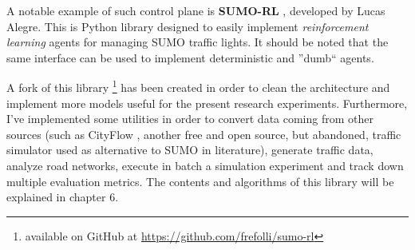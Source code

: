 A notable example of such control plane is \textbf{SUMO-RL} \cite{sumorl}, developed by Lucas Alegre. This is Python library designed to easily implement \textit{reinforcement learning} agents for managing SUMO traffic lights. It should be noted that the same interface can be used to implement deterministic and ''dumb`` agents.

A fork of this library \footnote{available on GitHub at \href{https://github.com/frefolli/sumo-rl}{https://github.com/frefolli/sumo-rl}} has been created in order to clean the architecture and implement more models useful for the present research experiments. Furthermore, I've implemented some utilities in order to convert data coming from other sources (such as CityFlow \cite{10.1145/3308558.3314139}, another free and open source, but abandoned, traffic simulator used as alternative to SUMO in literature), generate traffic data, analyze road networks, execute in batch a simulation experiment and track down multiple evaluation metrics. The contents and algorithms of this library will be explained in chapter 6. %
